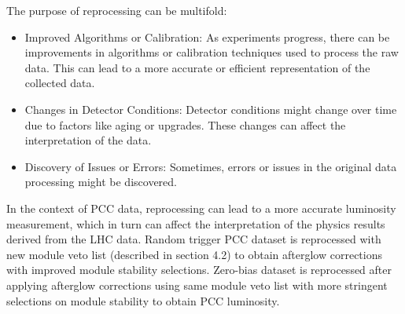 
The purpose of reprocessing can be multifold:

\begin{itemize}
  
\item Improved Algorithms or Calibration: As experiments progress, there can be improvements in algorithms or calibration techniques used to process the raw data. This can lead to a more accurate or efficient representation of the collected data.

\item Changes in Detector Conditions: Detector conditions might change over time due to factors like aging or upgrades. These changes can affect the interpretation of the data.

\item Discovery of Issues or Errors: Sometimes, errors or issues in the original data processing might be discovered.

\end{itemize}
  
In the context of PCC data, reprocessing can lead to a more accurate luminosity measurement, which in turn can affect the interpretation of the physics results derived from the LHC data. Random trigger PCC dataset is reprocessed with new module veto list (described in section 4.2) to obtain afterglow corrections with improved module stability selections. Zero-bias dataset is reprocessed after applying afterglow corrections using same module veto list with more stringent selections on module stability to obtain PCC luminosity.

